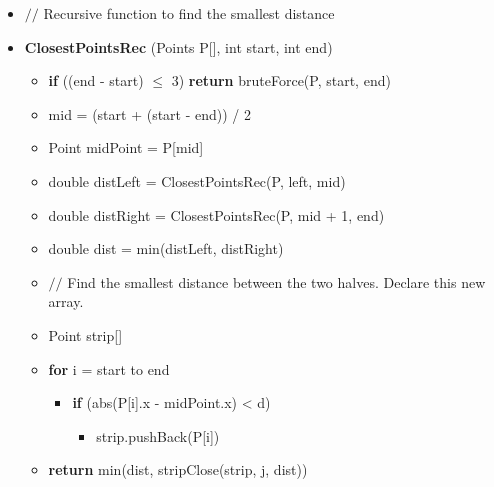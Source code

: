 \documentclass{article}[12pt]
\begin{document}
\begin{itemize}
  \item $//$ Recursive function to find the smallest distance
  \item \textbf{ClosestPointsRec} (Points P[], int start, int end)
    \begin{itemize}
      \item \textbf{if} ((end - start) $\leq$ 3) \textbf{return} bruteForce(P, start, end)
      \item mid = (start + (start - end)) /  2
      \item Point midPoint = P[mid]
      \item double distLeft = ClosestPointsRec(P, left, mid)
      \item double distRight = ClosestPointsRec(P, mid + 1, end)
      \item double dist = min(distLeft, distRight)

      \item $//$ Find the smallest distance between the two halves.
        Declare this new array.
      \item Point strip[]

      \item \textbf{for} i = start to end 
        \begin{itemize}
          \item \textbf{if} (abs(P[i].x - midPoint.x) < d)
            \begin{itemize}
              \item strip.pushBack(P[i])
            \end{itemize}
        \end{itemize}
      \item \textbf{return} min(dist, stripClose(strip, j, dist))
    \end{itemize}
\end{itemize}
\end{document}
